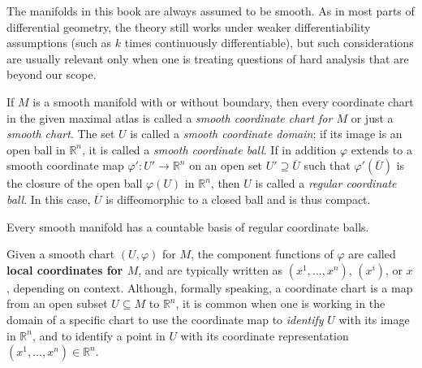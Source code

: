 The manifolds in this book are always assumed to be smooth. As in most parts of differential geometry, the theory still works under weaker differentiability assumptions (such as $k$ times continuously differentiable), but such considerations are usually relevant only when one is treating questions of hard analysis that are beyond our scope.

If $M$ is a smooth manifold with or without boundary, then every coordinate chart in the given maximal atlas is called a \emph{smooth coordinate chart for $M$} or just a \emph{smooth chart}. The set $U$ is called a \emph{smooth coordinate domain}; if its image is an open ball in $\mathbb{R}^n$, it is called a \emph{smooth coordinate ball}. If in addition $\varphi$ extends to a smooth coordinate map $\varphi' : U' \to \mathbb{R}^n$ on an open set $U' \supseteq \overline{U}$ such that $\varphi'(\overline{U})$ is the closure of the open ball $\varphi(U)$ in $\mathbb{R}^n$, then $U$ is called a \emph{regular coordinate ball}. In this case, $\overline{U}$ is diffeomorphic to a closed ball and is thus compact.

\begin{proposition}
\label{prop:countable-basis-regular-coordinate-balls}
Every smooth manifold has a countable basis of regular coordinate balls.
\end{proposition}

Given a smooth chart $(U, \varphi)$ for $M$, the component functions of $\varphi$ are called \textbf{local coordinates for $M$}, and are typically written as $(x^1, \ldots, x^n)$, $(x^i)$, or $x$, depending on context. Although, formally speaking, a coordinate chart is a map from an open subset $U \subseteq M$ to $\mathbb{R}^n$, it is common when one is working in the domain of a specific chart to use the coordinate map to \textit{identify} $U$ with its image in $\mathbb{R}^n$, and to identify a point in $U$ with its coordinate representation $(x^1, \ldots, x^n) \in \mathbb{R}^n$.

